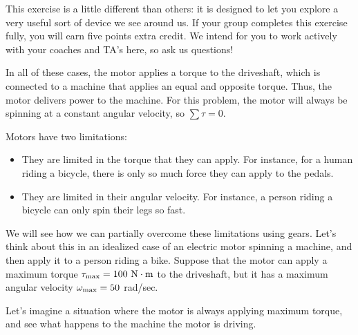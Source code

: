 \documentclass[12pt]{article}
\begin{document}
This exercise is a little different than others: it is designed to let you explore a very useful sort of device we see around us. If your group completes this exercise fully, you will earn five points extra credit. We intend for you to work actively with your coaches and TA's here, so ask us questions!

In all of these cases, the motor applies a torque to the driveshaft, which is connected to a machine that applies an equal and opposite torque. Thus, the motor delivers power to the machine. For this problem, the motor will always be spinning at a constant angular velocity, so $\sum \tau = 0$.

Motors have two limitations: 

\begin{itemize}
	\item They are limited in the torque that they can apply. For instance, for a human riding a bicycle, there is only so much force they can apply to the pedals.
	\item They are limited in their angular velocity. For instance, a person riding a bicycle can only spin their legs so fast.
\end{itemize}

We will see how we can partially overcome these limitations using gears. Let's think about this in an idealized case of an electric motor spinning a machine, and then apply it to a person riding a bike. Suppose that the motor can apply a maximum torque $\tau_{\rm {max}}=100~\rm N \cdot \rm m$ to the driveshaft, but it has a maximum angular velocity $\omega_{\rm max} = 50$ rad/sec.

Let's imagine a situation where the motor is always applying maximum torque, and see what happens to the machine the motor is driving.

\bigskip
\end{document}

